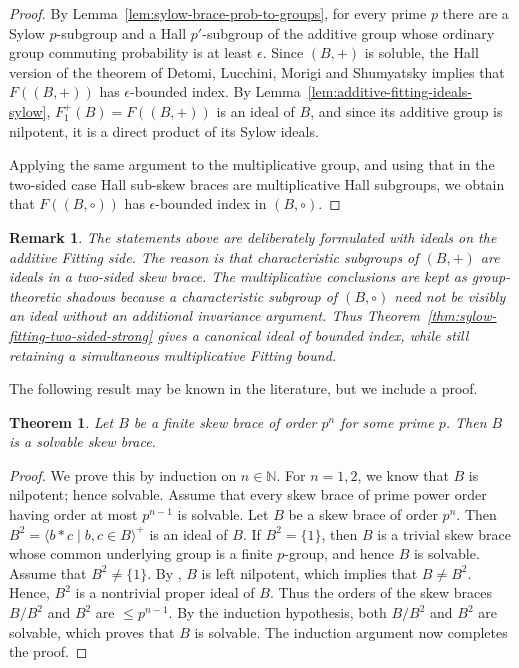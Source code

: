 \documentclass[10pt,a4paper]{amsart}
\numberwithin{equation}{section}
\newtheorem{rem}[equation]{Remark}
\newtheorem{thm}[equation]{Theorem}
\begin{document}
\begin{proof}
By Lemma~\ref{lem:sylow-brace-prob-to-groups}, for every prime $p$ there
are a Sylow $p$-subgroup and a Hall $p'$-subgroup of the additive group
whose ordinary group commuting probability is at least $\epsilon$. Since
$(B,+)$ is soluble, the Hall version of the theorem of Detomi, Lucchini,
Morigi and Shumyatsky \cite{DLMS25} implies that $F((B,+))$ has
$\epsilon$-bounded index. By Lemma~\ref{lem:additive-fitting-ideals-sylow},
$F^+_1(B)=F((B,+))$ is an ideal of $B$, and since its additive group is
nilpotent, it is a direct product of its Sylow ideals.

Applying the same argument to the multiplicative group, and using that in
the two-sided case Hall sub-skew braces are multiplicative Hall subgroups,
we obtain that $F((B,\circ))$ has $\epsilon$-bounded index in
$(B,\circ)$.
\end{proof}

\begin{rem}
The statements above are deliberately formulated with ideals on the
additive Fitting side. The reason is that characteristic subgroups of
$(B,+)$ are ideals in a two-sided skew brace. The multiplicative conclusions
are kept as group-theoretic shadows because a characteristic subgroup of
$(B,\circ)$ need not be visibly an ideal without an additional invariance
argument. Thus Theorem~\ref{thm:sylow-fitting-two-sided-strong} gives a
canonical ideal of bounded index, while still retaining a simultaneous
multiplicative Fitting bound.
\end{rem}

The following result may be known in the literature, but we include a proof.

\begin{thm}\label{p^n is solvable}
    Let $B$ be a finite skew brace of order $p^n$ for some prime $p$. Then $B$ is a solvable skew brace.
\end{thm}
\begin{proof}
    We prove this by induction on $n\in \mathbb{N}$. For $n=1,2$, we know that $B$ is nilpotent; hence solvable. Assume that every skew brace  of prime power order having order at most $p^{n-1}$ is solvable.  Let $B$ be a skew brace of order $p^n$. Then $B^2=\langle b\ast c \mid b,c\in B\rangle^+$ is an ideal of $B$.
    If $B^2=\{1\}$, then $B$ is a trivial skew brace whose common underlying group is a finite $p$-group, and hence $B$ is solvable. Assume that $B^2 \neq \{1\}$. By \cite[Proposition 4.4.]{CSV19}, $B$ is left nilpotent, which implies that $B\neq B^2$. Hence,  $B^2$ is a nontrivial proper ideal of $B$. Thus the orders of the skew braces $B/B^2$ and $B^2$ are $\leqslant p^{n-1}$. By the induction hypothesis, both $B/B^2$ and $B^2$ are solvable, which proves that $B$ is  solvable. The induction argument now completes the proof.
\end{proof}
\end{document}

